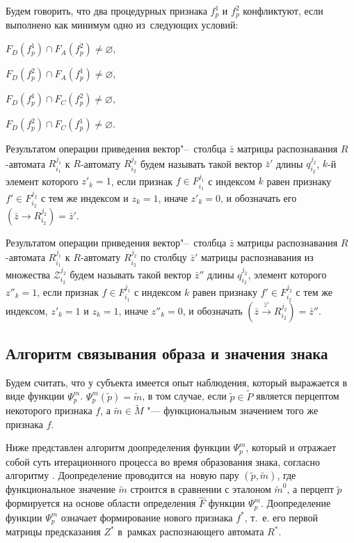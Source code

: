 \documentclass[a4paper, 12pt]{article}
\numberwithin{equation}{section}
\begin{document}
		Будем говорить, что два процедурных признака $f_p^1$ и $f_p^2$ конфликтуют, если выполнено как минимум одно из~следующих условий:

		\indent $F_D(f_p^1)\cap F_A(f_p^2)\not=\varnothing$,

		\indent $F_D(f_p^2)\cap F_A(f_p^1)\not=\varnothing$,

		\indent $F_D(f_p^1)\cap F_C(f_p^2)\not=\varnothing$,

		\indent $F_D(f_p^2)\cap F_C(f_p^1)\not=\varnothing$.
	
		Результатом операции приведения вектор"--~столбца $\bar z$ матрицы распознавания $R$-автомата $R_{i_1}^{j_1}$ к $R$-автомату $R_{i_2}^{j_2}$ будем называть такой вектор $\bar z'$ длины $q_{i_2}^{j_2}$, $k$-й элемент которого $z'_k=1$, если признак $f\in F_{i_1}^{j_1}$ с индексом $k$ равен признаку $f'\in F_{i_2}^{j_2}$ с тем же индексом и $z_k=1$, иначе $z'_k=0$, и обозначать его $(\bar z\rightarrow R_{i_2}^{j_2})=\bar z'$.
	
		Результатом операции приведения вектор"--~столбца $\bar z$ матрицы распознавания $R$-автомата $R_{i_1}^{j_1}$ к $R$-автомату $R_{i_2}^{j_2}$ по столбцу $\bar z'$ матрицы распознавания из множества  $\mathcal Z_{i_2}^{j_2}$ будем называть такой вектор $\bar z''$ длины $q_{i_2}^{j_2}$, элемент которого $z''_k=1$, если признак $f\in F_{i_1}^{j_1}$ с индексом $k$ равен признаку $f'\in F_{i_2}^{j_2}$ с тем же индексом, $z'_k=1$ и $z_k=1$, иначе $z''_k=0$, и обозначать $(\bar z\xrightarrow{\bar z'} R_{i_2}^{j_2})=\bar z''$.
	
	\subsection{Алгоритм связывания образа и значения знака}
	Будем считать, что у субъекта имеется опыт наблюдения, который выражается в виде функции $\Psi_p^m$. $\Psi_p^m(\tilde p)=\tilde m$, в том случае, если $\tilde p\in\tilde P$ является перцептом некоторого признака $f$, а $\tilde m\in\tilde M$ "--- функциональным значением того же признака $f$.
	
	Ниже представлен алгоритм доопределения функции $\Psi_p^m$, который и отражает собой суть итерационного процесса во время образования знака, согласно алгоритму \cite{PanovA2014a}. Доопределение проводится на~новую пару $(\tilde p,\tilde m)$, где функциональное значение $\tilde m$ строится в сравнении с эталоном $\tilde m^0$, а перцепт $\tilde p$ формируется на основе области определения $\hat F$ функции $\Psi_p^m$. Доопределение функции $\Psi_p^m$ означает формирование нового признака $f^*$, т.~е. его первой матрицы предсказания $Z^*$ в~рамках распознающего автомата $R^*$.
	
\end{document}
